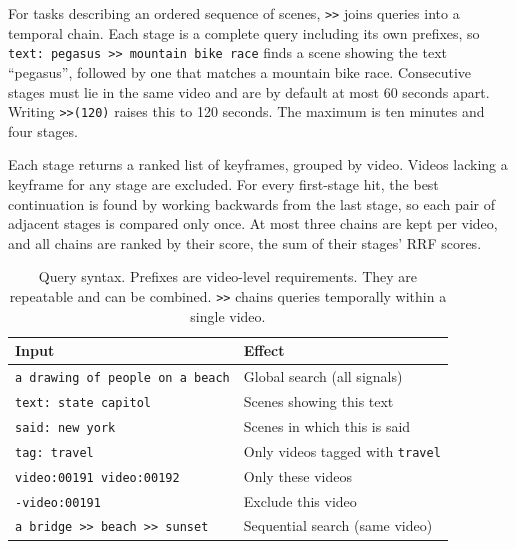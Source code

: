 \documentclass{llncs}
\newcommand{\q}[1]{\texttt{\small #1}}
\newcommand{\tchain}{>{}>}
\begin{document}
For tasks describing an ordered sequence of scenes, \q{\tchain{}} joins queries into a temporal chain. 
Each stage is a complete query including its own prefixes, so \q{text: pegasus \tchain{} mountain bike race} finds a scene showing
the text ``pegasus'', followed by one that matches a mountain bike race. 
Consecutive stages must lie in the same video and are by default at most 60 seconds apart.
Writing \q{\tchain{}(120)} raises this to 120 seconds. The maximum is ten minutes and four stages.

Each stage returns a ranked list of keyframes, grouped by video. Videos lacking a keyframe for any stage are excluded. 
For every first-stage hit, the best continuation is found by working backwards from the last stage, so each pair of adjacent stages is compared only once. 
At most three chains are kept per video, and all chains are ranked by their score, the sum of their stages' RRF scores.

\begin{table}[ht]
  \caption{
    Query syntax. Prefixes are video-level requirements. They are repeatable and can be combined. \q{\tchain{}} chains queries temporally within a single video.
  }
  \label{tabSyntax}
  \centering 
  \begin{tabular}{@{}ll@{}}
    \toprule
    Input & Effect \\
    \midrule
    \q{a drawing of people on a beach}            & Global search (all signals) \\
    \q{text: state capitol}                       & Scenes showing this text \\
    \q{said: new york}                            & Scenes in which this is said \\
    \q{tag: travel}                               & Only videos tagged with \q{travel} \\
    \q{video:00191 video:00192}                   & Only these videos  \\
    \q{-video:00191}                              & Exclude this video  \\
    \q{a bridge \tchain{} beach \tchain{} sunset} & Sequential search (same video) \\
    \bottomrule
  \end{tabular}
\end{table}

\end{document}
